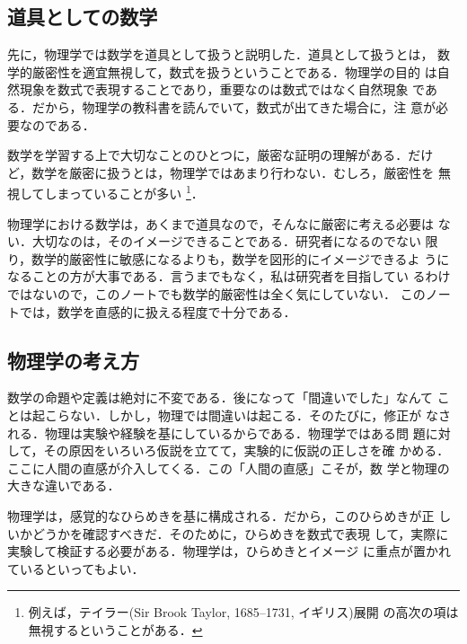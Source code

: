         \subsection{道具としての数学}
            先に，物理学では数学を道具として扱うと説明した．道具として扱うとは，
            数学的厳密性を適宜無視して，数式を扱うということである．物理学の目的
            は自然現象を数式で表現することであり，重要なのは数式ではなく自然現象
            である．だから，物理学の教科書を読んでいて，数式が出てきた場合に，注
            意が必要なのである．

            数学を学習する上で大切なことのひとつに，厳密な証明の理解がある．だけ
            ど，数学を厳密に扱うとは，物理学ではあまり行わない．むしろ，厳密性を
            無視してしまっていることが多い
                \footnote{
                    例えば，テイラー(Sir Brook Taylor, 1685--1731, イギリス)展開
                    の高次の項は無視するということがある．
                }．

            物理学における数学は，あくまで道具なので，そんなに厳密に考える必要は
            ない．大切なのは，そのイメージできることである．研究者になるのでない
            限り，数学的厳密性に敏感になるよりも，数学を図形的にイメージできるよ
            うになることの方が大事である．言うまでもなく，私は研究者を目指してい
            るわけではないので，このノートでも数学的厳密性は全く気にしていない．
            このノートでは，数学を直感的に扱える程度で十分である．


        \subsection{物理学の考え方}
            数学の命題や定義は絶対に不変である．後になって「間違いでした」なんて
            ことは起こらない．しかし，物理では間違いは起こる．そのたびに，修正が
            なされる．物理は実験や経験を基にしているからである．物理学ではある問
            題に対して，その原因をいろいろ仮説を立てて，実験的に仮説の正しさを確
            かめる．ここに人間の直感が介入してくる．この「人間の直感」こそが，数
            学と物理の大きな違いである．

            物理学は，感覚的なひらめきを基に構成される．だから，このひらめきが正
            しいかどうかを確認すべきだ．そのために，ひらめきを数式で表現
            して，実際に実験して検証する必要がある．物理学は，ひらめきとイメージ
            に重点が置かれているといってもよい．

